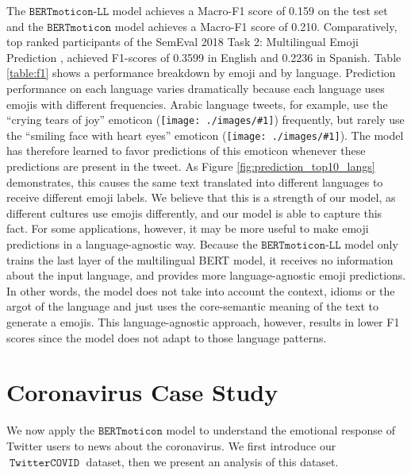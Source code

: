 \documentclass[11pt]{article}
\newcommand{\bertmoji}{\texttt{BERTmoticon}}
\newcommand{\bertmojill}{\texttt{BERTmoticon-LL}}
\newcommand{\emoji}[1]{\texttt{[image: ./images/\#1]}}
\DeclareMathOperator{\corona}{\texttt{TwitterCOVID}}
\begin{document}
The $\bertmojill$ model achieves a Macro-F1 score of 0.159 on the test set and the $\bertmoji$ model achieves a Macro-F1 score of 0.210. Comparatively, top ranked participants of the SemEval 2018 Task 2: Multilingual Emoji Prediction \citep{barbieri2018semeval}, \citep{coltekin-rama-2018-tubingen} achieved F1-scores of 0.3599 in English and 0.2236 in Spanish.
Table \ref{table:f1} shows a performance breakdown by emoji and by language.
Prediction performance on each language varies dramatically because each language uses emojis with different frequencies.
Arabic language tweets, for example, use the ``crying tears of joy'' emoticon (\emoji{1f602}) frequently,
but rarely use the ``smiling face with heart eyes'' emoticon (\emoji{1f60d}).
The model has therefore learned to favor predictions of this emoticon whenever these predictions are present in the tweet.
As Figure \ref{fig:prediction_top10_langs} demonstrates, this causes the same text translated into different languages to receive different emoji labels.
We believe that this is a strength of our model,
as different cultures use emojis differently,
and our model is able to capture this fact.
For some applications, however, it may be more useful to make emoji predictions in a language-agnostic way.
Because the $\bertmojill$ model only trains the last layer of the multilingual BERT model,
it receives no information about the input language,
and provides more language-agnostic emoji predictions. In other words, the model does not take into account the context, idioms or the argot of the language and just uses the core-semantic meaning of the text to generate a emojis.
This language-agnostic approach, however, results in  lower F1 scores since the model does not adapt to those language patterns.


\section{Coronavirus Case Study}
\label{sec:casestudy}

We now apply the $\bertmoji$ model to understand the emotional response of Twitter users to news about the coronavirus.
We first introduce our $\corona$ dataset,
then we present an analysis of this dataset.
\end{document}
